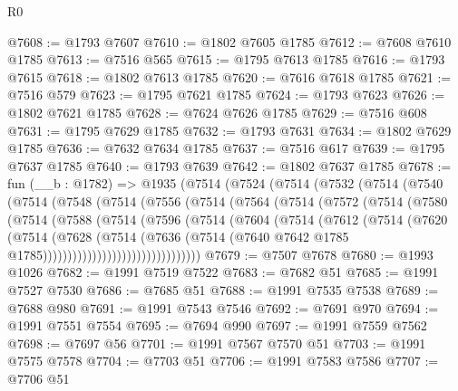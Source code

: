 \begin{lexlean}{R0}
\begin{coremodule}
@7608 := @1793 @7607
@7610 := @1802 @7605 @1785
@7612 := @7608 @7610 @1785
@7613 := @7516 @565
@7615 := @1795 @7613 @1785
@7616 := @1793 @7615
@7618 := @1802 @7613 @1785
@7620 := @7616 @7618 @1785
@7621 := @7516 @579
@7623 := @1795 @7621 @1785
@7624 := @1793 @7623
@7626 := @1802 @7621 @1785
@7628 := @7624 @7626 @1785
@7629 := @7516 @608
@7631 := @1795 @7629 @1785
@7632 := @1793 @7631
@7634 := @1802 @7629 @1785
@7636 := @7632 @7634 @1785
@7637 := @7516 @617
@7639 := @1795 @7637 @1785
@7640 := @1793 @7639
@7642 := @1802 @7637 @1785
@7678 := fun (__b : @1782) =>
  @1935
    (@7514
      (@7524
        (@7514
          (@7532
            (@7514
              (@7540
                (@7514
                  (@7548
                    (@7514
                      (@7556
                        (@7514
                          (@7564
                            (@7514
                              (@7572
                                (@7514
                                  (@7580
                                    (@7514
                                      (@7588
                                        (@7514
                                          (@7596
                                            (@7514
                                              (@7604
                                                (@7514
                                                  (@7612
                                                    (@7514
                                                      (@7620
                                                        (@7514
                                                          (@7628
                                                            (@7514
                                                              (@7636
                                                                (@7514
                                                                  (@7640
                                                                    @7642
                                                                    @1785
                                                                    @1785))))))))))))))))))))))))))))))))
@7679 := @7507 @7678
@7680 := @1993 @1026
@7682 := @1991 @7519 @7522
@7683 := @7682 @51
@7685 := @1991 @7527 @7530
@7686 := @7685 @51
@7688 := @1991 @7535 @7538
@7689 := @7688 @980
@7691 := @1991 @7543 @7546
@7692 := @7691 @970
@7694 := @1991 @7551 @7554
@7695 := @7694 @990
@7697 := @1991 @7559 @7562
@7698 := @7697 @56
@7701 := @1991 @7567 @7570 @51
@7703 := @1991 @7575 @7578
@7704 := @7703 @51
@7706 := @1991 @7583 @7586
@7707 := @7706 @51

\end{coremodule}
\end{lexlean}
